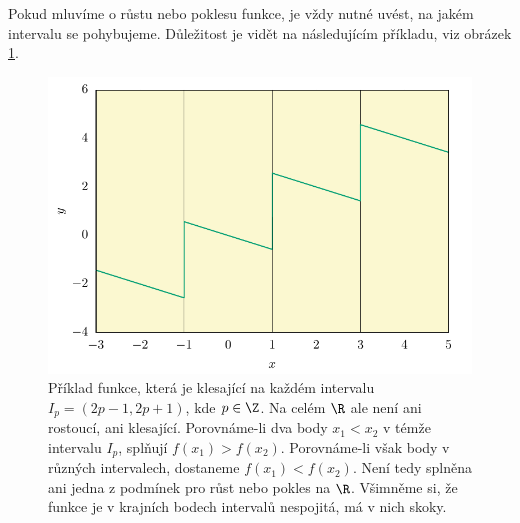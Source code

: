 \begin{remark}
    Pokud mluvíme o růstu nebo poklesu funkce, je vždy nutné uvést, na jakém intervalu se pohybujeme. Důležitost je vidět na následujícím příkladu, viz obrázek \ref{fig:1a-funkce-ne}.

    \begin{figure}[H]
        \centering
        \includegraphics[scale = 0.7]{Gnuplot/Figures/periodicka-klesajici.pdf}
        
        \caption{Příklad funkce, která je klesající na každém intervalu $I_p = (2p-1,2p+1)$, kde $p \in \Z$. Na celém $\R$ ale není ani rostoucí, ani klesající. Porovnáme-li dva body $x_1 < x_2$ v témže intervalu $I_p$, splňují $f(x_1) > f(x_2)$. Porovnáme-li však body v různých intervalech, dostaneme $f(x_1) < f(x_2)$. Není tedy splněna ani jedna z podmínek pro růst nebo pokles na $\R$. Všimněme si, že funkce je v krajních bodech intervalů nespojitá, má v nich skoky.}
        \label{fig:1a-funkce-ne}
    \end{figure}

\end{remark}

